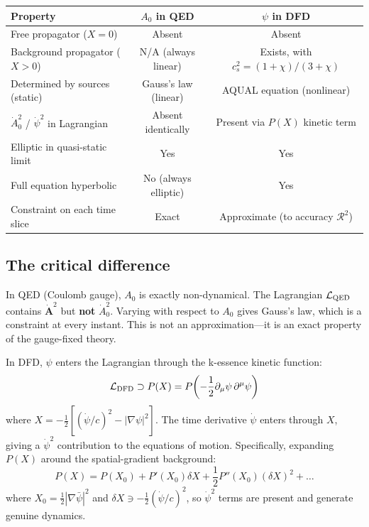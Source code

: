 \documentclass[12pt,a4paper]{article}
\begin{document}
\begin{center}
\renewcommand{\arraystretch}{1.3}
\begin{tabular}{>{\raggedright}p{5cm}cc}
\toprule
\textbf{Property} & \textbf{$A_0$ in QED} & \textbf{$\psi$ in DFD} \\
\midrule
Free propagator ($X=0$) & Absent & Absent \\
Background propagator ($X>0$) & N/A (always linear) & Exists, with $c_s^2 = (1+\chi)/(3+\chi)$ \\
Determined by sources (static) & Gauss's law (linear) & AQUAL equation (nonlinear) \\
$\dot{A}_0^2$ / $\dot\psi^2$ in Lagrangian & Absent identically & Present via $P(X)$ kinetic term \\
Elliptic in quasi-static limit & Yes & Yes \\
Full equation hyperbolic & No (always elliptic) & Yes \\
Constraint on each time slice & Exact & Approximate (to accuracy $\mathcal{R}^2$) \\
\bottomrule
\end{tabular}
\end{center}

\subsection{The critical difference}

In QED (Coulomb gauge), $A_0$ is exactly non-dynamical. The Lagrangian
$\mathcal{L}_{\rm QED}$ contains $\dot{\mathbf{A}}^2$ but \textbf{not}
$\dot{A}_0^2$. Varying with respect to $A_0$ gives Gauss's law, which is
a constraint at every instant. This is not an approximation---it is an exact
property of the gauge-fixed theory.

In DFD, $\psi$ enters the Lagrangian through the k-essence kinetic function:
\begin{equation}
\mathcal{L}_{\rm DFD} \supset P(X) = P\!\left(-\frac{1}{2}\partial_\mu\psi\,\partial^\mu\psi\right)
\end{equation}
where $X = -\frac{1}{2}[(\dot\psi/c)^2 - |\nabla\psi|^2]$. The time
derivative $\dot\psi$ enters through $X$, giving a $\dot\psi^2$ contribution
to the equations of motion. Specifically, expanding $P(X)$ around the
spatial-gradient background:
\begin{equation}
P(X) = P(X_0) + P'(X_0)\delta X + \frac{1}{2}P''(X_0)(\delta X)^2 + \ldots
\end{equation}
where $X_0 = \frac{1}{2}|\nabla\bar\psi|^2$ and
$\delta X \ni -\frac{1}{2}(\dot\psi/c)^2$, so $\dot\psi^2$ terms are
present and generate genuine dynamics.
\end{document}
